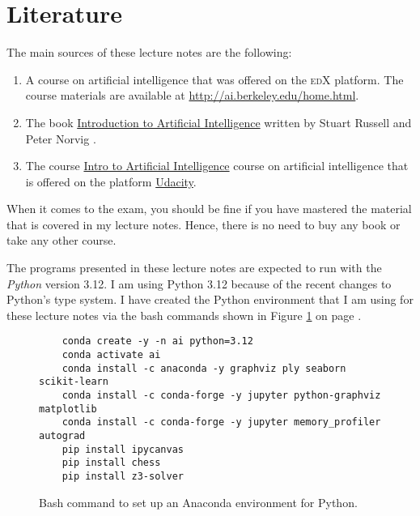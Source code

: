 \section{Literature}
The main sources of these lecture notes are the following:
\begin{enumerate}
\item A course on artificial intelligence that was offered on the \textsc{edX} platform.  The course
      materials are available at \href{http://ai.berkeley.edu/home.html}{http://ai.berkeley.edu/home.html}.
\item The book \href{https://www.amazon.de/Artificial-Intelligence-Modern-Approach-Global/dp/1292401133/}{
       Introduction to Artificial Intelligence}
      written by Stuart Russell and Peter Norvig \cite{russell:2020}.
\item The course \href{https://www.udacity.com/course/intro-to-artificial-intelligence--cs271}{
      Intro to Artificial Intelligence} course on artificial intelligence that is offered on the
      platform \href{https://www.udacity.com}{Udacity}.  
\end{enumerate}
When it comes to the exam, you should be fine if you have mastered the material that is covered in my
lecture notes.  Hence, there is no need to buy any book or take any other course.
\pagebreak

\remark
The programs presented in these lecture notes are expected to run with the \textsl{Python} version 3.12.
I am using Python 3.12 because of the recent changes to Python's type system.
I have created the Python environment that I am using for these lecture notes via the bash commands shown in
Figure \ref{fig:ai.sh} on page \pageref{fig:ai.sh}.

\begin{figure}[!ht]
\centering
\begin{verbatim}
    conda create -y -n ai python=3.12 
    conda activate ai
    conda install -c anaconda -y graphviz ply seaborn scikit-learn 
    conda install -c conda-forge -y jupyter python-graphviz matplotlib 
    conda install -c conda-forge -y jupyter memory_profiler autograd 
    pip install ipycanvas
    pip install chess 
    pip install z3-solver  
\end{verbatim}
\vspace*{-0.3cm}
\caption{Bash command to set up an Anaconda environment for Python.}
\label{fig:ai.sh}
\end{figure}



